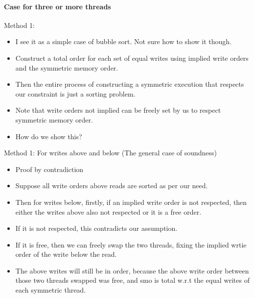     \paragraph{Case for three or more threads}
        Method 1: 
        \begin{itemize}
            \item I see it as a simple case of bubble sort. Not sure how to show  it though. 
            \item Construct a total order for each set of equal writes using implied write orders and the symmetric memory order. 
            \item Then the entire process of constructing a symmetric execution that respects our constraint is just a sorting problem. 
            \item Note that write orders not implied can be freely set by us to respect symmetric memory order. 
            \item How do we show this? 
        \end{itemize}

        Method 1: For writes above and below (The general case of soundness)
        \begin{itemize}
            \item Proof by contradiction 
            \item Suppose all write orders above reads are sorted as per our need. 
            \item Then for writes below, firstly, if an implied write order is not respected, then either the writes above also not respected or it is a free order. 
            \item If it is not respected, this contradicts our assumption.
            \item If it is free, then we can freely swap the two threads, fixing the implied wrtie order of the write below the read. 
            \item The above writes will still be in order, because the above write order between those two threads swapped was free, and smo is total w.r.t the equal writes of each symmetric thread.  
        \end{itemize}

